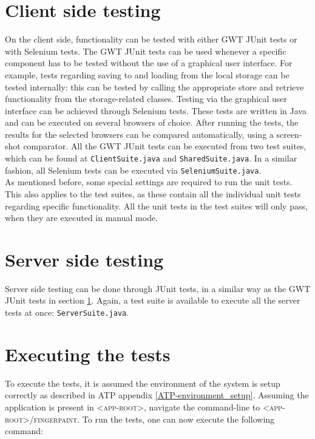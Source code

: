 \section{Client side testing}\label{sec:clientProc}
On the client side, functionality can be tested with either GWT JUnit tests or with Selenium tests. The GWT JUnit tests can be used whenever a specific component has to be tested without the use of a graphical user interface. For example, tests regarding saving to and loading from the local storage can be tested internally: this can be tested by calling the appropriate store and retrieve functionality from the storage-related classes. Testing via the graphical user interface can be achieved through Selenium tests. These tests are written in Java and can be executed on several browsers of choice. After running the tests, the results for the selected browsers can be compared automatically, using a screen-shot comparator.
All the GWT JUnit tests can be executed from two test suites, which can be found at \texttt{ClientSuite.java} and \texttt{SharedSuite.java}. In a similar fashion, all Selenium tests can be executed via \texttt{SeleniumSuite.java}. \\
As mentioned before, some special settings are required to run the unit tests. This also applies to the test suites, as these contain all the individual unit tests regarding specific functionality. All the unit tests in the test suites will only pass, when they are executed in manual mode.

\section{Server side testing}\label{sec:serverProc}
Server side testing can be done through JUnit tests, in a similar way as the GWT JUnit tests in section \ref{sec:clientProc}. Again, a test suite is available to execute all the server tests at once: \texttt{ServerSuite.java}.

\section{Executing the tests}\label{sec:exectest}
To execute the tests, it is assumed the environment of the system is setup correctly as described in ATP appendix \ref*{ATP-environment_setup}. 
Assuming the application is present in \textsc{<app-root>}, navigate the command-line to \textsc{<app-root>/fingerpaint}. To run the tests, one
can now execute the following command:

